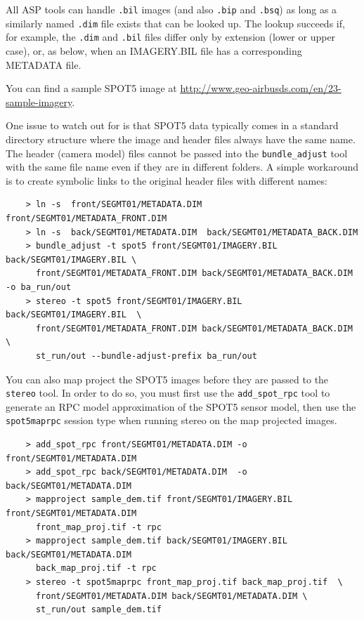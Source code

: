 All ASP tools can handle \texttt{.bil} images (and also \texttt{.bip}
and \texttt{.bsq}) as long as a similarly named \texttt{.dim} file
exists that can be looked up. The lookup succeeds if, for example, the
\texttt{.dim} and \texttt{.bil} files differ only by extension (lower or
upper case), or, as below, when an IMAGERY.BIL file has a corresponding
METADATA file.

You can find a sample SPOT5 image at 
\url{http://www.geo-airbusds.com/en/23-sample-imagery}.

One issue to watch out for is that SPOT5 data typically comes in a standard
directory structure where the image and header files always have the same name.
The header (camera model) files cannot be passed into the \texttt{bundle\_adjust} tool with the
same file name even if they are in different folders.  A simple workaround is to create
symbolic links to the original header files with different names:

\begin{verbatim}
    > ln -s  front/SEGMT01/METADATA.DIM front/SEGMT01/METADATA_FRONT.DIM
    > ln -s  back/SEGMT01/METADATA.DIM  back/SEGMT01/METADATA_BACK.DIM
    > bundle_adjust -t spot5 front/SEGMT01/IMAGERY.BIL back/SEGMT01/IMAGERY.BIL \
      front/SEGMT01/METADATA_FRONT.DIM back/SEGMT01/METADATA_BACK.DIM -o ba_run/out
    > stereo -t spot5 front/SEGMT01/IMAGERY.BIL back/SEGMT01/IMAGERY.BIL  \ 
      front/SEGMT01/METADATA_FRONT.DIM back/SEGMT01/METADATA_BACK.DIM \ 
      st_run/out --bundle-adjust-prefix ba_run/out
\end{verbatim}

You can also map project the SPOT5 images before they are passed to the 
\texttt{stereo} tool.  In order to do so, you must first use the 
\texttt{add\_spot\_rpc} tool to generate an RPC model approximation of
the SPOT5 sensor model, then use the \texttt{spot5maprpc} session type
when running stereo on the map projected images.

\begin{verbatim}
    > add_spot_rpc front/SEGMT01/METADATA.DIM -o front/SEGMT01/METADATA.DIM
    > add_spot_rpc back/SEGMT01/METADATA.DIM  -o back/SEGMT01/METADATA.DIM
    > mapproject sample_dem.tif front/SEGMT01/IMAGERY.BIL front/SEGMT01/METADATA.DIM 
      front_map_proj.tif -t rpc
    > mapproject sample_dem.tif back/SEGMT01/IMAGERY.BIL back/SEGMT01/METADATA.DIM 
      back_map_proj.tif -t rpc
    > stereo -t spot5maprpc front_map_proj.tif back_map_proj.tif  \ 
      front/SEGMT01/METADATA.DIM back/SEGMT01/METADATA.DIM \ 
      st_run/out sample_dem.tif
\end{verbatim}

